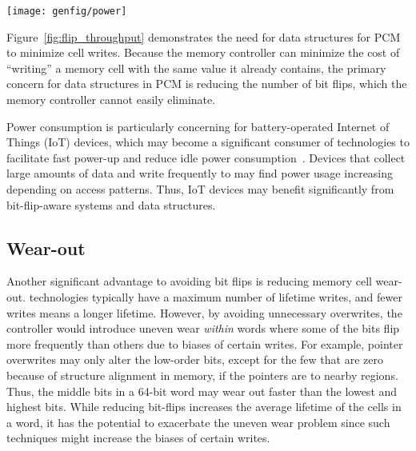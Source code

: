 \begin{SCfigure}
	\centering
	\texttt{[image: genfig/power]}
	\caption[Power use as a function of flips per second]{Power use as a function of flips per second~\cite{bittman:nvmsa18}.}
	\label{fig:flip_throughput}
\end{SCfigure}

Figure~\ref{fig:flip_throughput} demonstrates the need for data structures for
PCM to minimize cell writes.  Because the memory controller can minimize the
cost of ``writing'' a memory cell with the same value it already contains, the
primary concern for data structures in PCM is reducing the number of bit flips,
which the memory controller cannot easily eliminate.

Power consumption is particularly concerning for battery-operated Internet of Things (IoT) devices,
which may become a significant consumer of \NVM technologies to facilitate fast power-up and reduce
idle power consumption~\cite{Jayakumar2014powering,jayakumar2014quickrecall}. Devices that collect
large amounts of data and write frequently to \NVM may find power usage
increasing depending on access patterns. Thus, IoT devices may benefit significantly
from bit-flip-aware systems and data structures.


\subsection{Wear-out}

Another significant advantage to avoiding bit flips is reducing memory cell
wear-out. \NVM technologies typically have a maximum number of lifetime writes,
and fewer writes means a longer lifetime. However, by avoiding unnecessary overwrites,
the controller would introduce uneven wear \emph{within} \NVM words where some of the bits flip
more frequently than others due to biases of certain writes.
For example, pointer overwrites may only alter the low-order bits, except
for the few that are zero because of structure alignment in memory, if the
pointers are to nearby regions. Thus, the middle bits in a 64-bit word may
wear out faster than the lowest and highest bits. While reducing bit-flips increases the
average lifetime of the cells in a word, it has the potential to exacerbate the uneven wear
problem since such techniques might increase the biases of certain writes.

